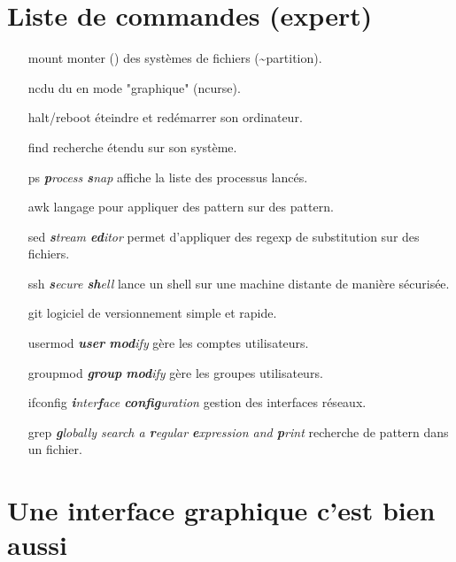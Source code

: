 \documentclass[french, a4paper, 12pt, titlepage]{article}
\begin{document}
\section{Liste de commandes (expert)}
\begin{enumerate}
\item[mount] monter () des systèmes de fichiers (\~{}partition).
\item[ncdu] du en mode "graphique" (ncurse).
\item[halt/reboot] éteindre et redémarrer son ordinateur.
\item[find] recherche étendu sur son système.
\item[ps] \emph{\textbf{p}rocess \textbf{s}nap} affiche la liste des processus lancés.
\item[awk] langage pour appliquer des pattern sur des pattern.
\item[sed] \emph{\textbf{s}tream \textbf{ed}itor} permet d'appliquer des regexp de substitution sur des fichiers.
\item[ssh] \emph{\textbf{s}ecure \textbf{sh}ell} lance un shell sur une machine distante de manière sécurisée.
\item[git] logiciel de versionnement simple et rapide.
\item[usermod] \emph{\textbf{user} \textbf{mod}ify} gère les comptes utilisateurs.
\item[groupmod] \emph{\textbf{group} \textbf{mod}ify} gère les groupes utilisateurs.
\item[ifconfig] \emph{\textbf{i}nter\textbf{f}ace \textbf{config}uration} gestion des interfaces réseaux.
\item[grep] \emph{\textbf{g}lobally search a \textbf{r}egular \textbf{e}xpression and \textbf{p}rint} recherche de pattern dans un fichier.
\end{enumerate}















\section{Une interface graphique c'est bien aussi}
\end{document}
